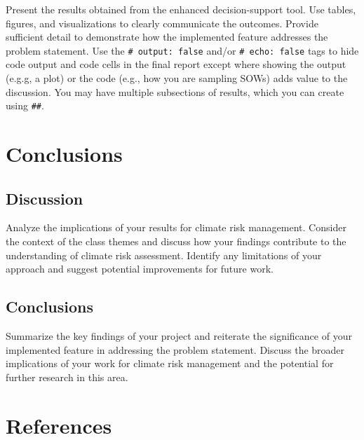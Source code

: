 \documentclass[
  11pt,
]{article}
\newlength{\cslhangindent}
\newlength{\cslentryspacingunit} %
\newenvironment{CSLReferences}[2] %
 {%
  \setlength{\parindent}{0pt}
  \ifodd #1
  \let\oldpar\par
  \def\par{\hangindent=\cslhangindent\oldpar}
  \fi
  \setlength{\parskip}{#2\cslentryspacingunit}
 }%
 {}
\begin{document}
Present the results obtained from the enhanced decision-support tool.
Use tables, figures, and visualizations to clearly communicate the
outcomes. Provide sufficient detail to demonstrate how the implemented
feature addresses the problem statement. Use the
\texttt{\#\textbar{}\ output:\ false} and/or
\texttt{\#\textbar{}\ echo:\ false} tags to hide code output and code
cells in the final report except where showing the output (e.g.g, a
plot) or the code (e.g., how you are sampling SOWs) adds value to the
discussion. You may have multiple subsections of results, which you can
create using \texttt{\#\#}.

\hypertarget{conclusions}{%
\section{Conclusions}\label{conclusions}}

\hypertarget{discussion}{%
\subsection{Discussion}\label{discussion}}

Analyze the implications of your results for climate risk management.
Consider the context of the class themes and discuss how your findings
contribute to the understanding of climate risk assessment. Identify any
limitations of your approach and suggest potential improvements for
future work.

\hypertarget{conclusions-1}{%
\subsection{Conclusions}\label{conclusions-1}}

Summarize the key findings of your project and reiterate the
significance of your implemented feature in addressing the problem
statement. Discuss the broader implications of your work for climate
risk management and the potential for further research in this area.

\hypertarget{references}{%
\section{References}\label{references}}

\hypertarget{refs}{}
\begin{CSLReferences}{0}{0}
\end{CSLReferences}
\end{document}

